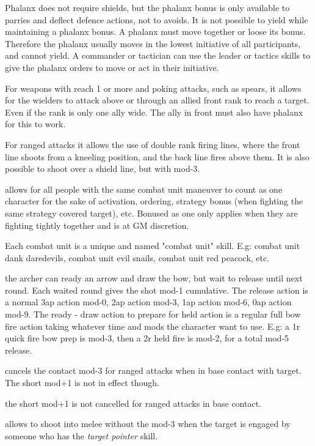 Phalanx does not require shields, but the phalanx bonus is only available to parries and deflect defence actions, not to avoids.
It is not possible to yield while maintaining a phalanx bonus. A phalanx must move together or loose its bonus. Therefore the phalanx usually moves in the lowest initiative of all participants, and cannot yield. A commander or tactician can use the leader or tactics skills to give the phalanx orders to move or act in their initiative.

For weapons with reach 1 or more and poking attacks, such as spears, it allows for the wielders to attack above or through an allied front rank to reach a target. Even if the rank is only one ally wide. The ally in front must also have phalanx for this to work.

For ranged attacks it allows the use of double rank firing lines, where the front line shoots from a kneeling position, and the back line fires above them. It is also possible to shoot over a shield line, but with mod-3.


 allows for all people with the same combat unit maneuver to count as one character for the sake of activation, ordering, strategy bonus (when fighting the same strategy covered target), etc. Bonused as one only applies when they are fighting tightly together and is at GM discretion.

Each combat unit is a unique and named "combat unit" skill. E.g: combat unit dank daredevils, combat unit evil snails, combat unit red peacock, etc.


 the archer can ready an arrow and draw the bow, but wait to release until next round. Each waited round gives the shot mod-1 cumulative. The release action is a normal 3ap action mod-0, 2ap action mod-3, 1ap action mod-6, 0ap action mod-9.
The ready - draw action to prepare for held action is a regular full bow fire action taking whatever time and mods the character want to use.
E.g: a 1r quick fire bow prep is mod-3, then a 2r held fire is mod-2, for a total mod-5 release.


 cancels the contact mod-3 for ranged attacks when in base contact with target. The short mod+1 is not in effect though.


 the short mod+1 is not cancelled for ranged attacks in base contact.


 allows to shoot into melee without the mod-3 when the target is engaged by someone who has the \emph{target pointer} skill.

